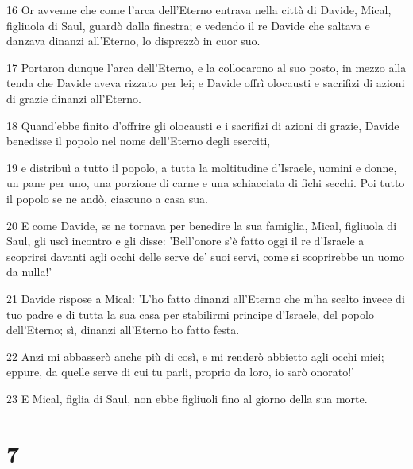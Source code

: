 \par 16 Or avvenne che come l'arca dell'Eterno entrava nella città di Davide, Mical, figliuola di Saul, guardò dalla finestra; e vedendo il re Davide che saltava e danzava dinanzi all'Eterno, lo disprezzò in cuor suo.
\par 17 Portaron dunque l'arca dell'Eterno, e la collocarono al suo posto, in mezzo alla tenda che Davide aveva rizzato per lei; e Davide offrì olocausti e sacrifizi di azioni di grazie dinanzi all'Eterno.
\par 18 Quand'ebbe finito d'offrire gli olocausti e i sacrifizi di azioni di grazie, Davide benedisse il popolo nel nome dell'Eterno degli eserciti,
\par 19 e distribuì a tutto il popolo, a tutta la moltitudine d'Israele, uomini e donne, un pane per uno, una porzione di carne e una schiacciata di fichi secchi. Poi tutto il popolo se ne andò, ciascuno a casa sua.
\par 20 E come Davide, se ne tornava per benedire la sua famiglia, Mical, figliuola di Saul, gli uscì incontro e gli disse: 'Bell'onore s'è fatto oggi il re d'Israele a scoprirsi davanti agli occhi delle serve de' suoi servi, come si scoprirebbe un uomo da nulla!'
\par 21 Davide rispose a Mical: 'L'ho fatto dinanzi all'Eterno che m'ha scelto invece di tuo padre e di tutta la sua casa per stabilirmi principe d'Israele, del popolo dell'Eterno; sì, dinanzi all'Eterno ho fatto festa.
\par 22 Anzi mi abbasserò anche più di così, e mi renderò abbietto agli occhi miei; eppure, da quelle serve di cui tu parli, proprio da loro, io sarò onorato!'
\par 23 E Mical, figlia di Saul, non ebbe figliuoli fino al giorno della sua morte.

\chapter{7}

